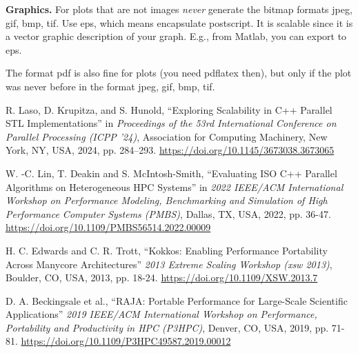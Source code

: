 \documentclass[sigconf]{acmart}
\newcommand{\mypar}[1]{{\bf #1.}}
\begin{document}
\mypar{Graphics} For plots that are not images {\em never} generate the bitmap formats
jpeg, gif, bmp, tif. Use eps, which means encapsulate postscript. It is
scalable since it is a vector graphic description of your graph. E.g.,
from Matlab, you can export to eps.

The format pdf is also fine for plots (you need pdflatex then), but only if the
plot was never before in the format jpeg, gif, bmp, tif.

\balance{}

\begin{thebibliography}{1}

  R. Laso, D. Krupitza, and S. Hunold, ``Exploring Scalability in C++ Parallel STL Implementations'' in \textit{Proceedings of the 53rd International Conference on Parallel Processing (ICPP '24)},
  Association for Computing Machinery, New York, NY, USA, 2024, pp. 284--293.
  \url{https://doi.org/10.1145/3673038.3673065}

  W. -C. Lin, T. Deakin and S. McIntosh-Smith, ``Evaluating ISO C++ Parallel Algorithms on Heterogeneous HPC Systems'' in  \textit{2022 IEEE/ACM International Workshop on Performance Modeling, Benchmarking and Simulation of High Performance Computer Systems (PMBS)},
  Dallas, TX, USA, 2022, pp. 36-47.
  \url{https://doi.org/10.1109/PMBS56514.2022.00009}

  H. C. Edwards and C. R. Trott, ``Kokkos: Enabling Performance Portability Across Manycore Architectures'' \textit{2013 Extreme Scaling Workshop (xsw 2013)},
  Boulder, CO, USA, 2013, pp. 18-24.
  \url{https://doi.org/10.1109/XSW.2013.7}

  D. A. Beckingsale et al., ``RAJA: Portable Performance for Large-Scale Scientific Applications'' \textit{2019 IEEE/ACM International Workshop on Performance, Portability and Productivity in HPC (P3HPC)},
  Denver, CO, USA, 2019, pp. 71-81.
  \url{https://doi.org/10.1109/P3HPC49587.2019.00012}

\end{thebibliography}
\end{document}
